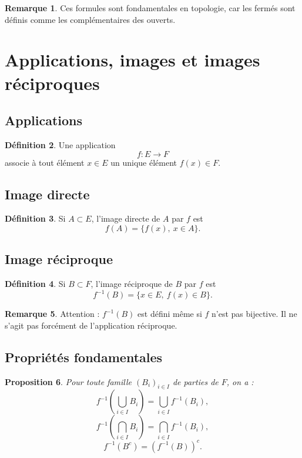 \documentclass[11pt,a4paper]{article}
\theoremstyle{definition}
\newtheorem{definition}{Définition}[section]
\newtheorem{remarque}[definition]{Remarque}
\theoremstyle{plain}
\newtheorem{proposition}[definition]{Proposition}
\begin{document}
\begin{remarque}
Ces formules sont fondamentales en topologie, car les fermés sont définis comme les complémentaires des ouverts.
\end{remarque}

\section{Applications, images et images réciproques}

\subsection{Applications}

\begin{definition}
Une application
\[
f:E\to F
\]
associe à tout élément $x\in E$ un unique élément $f(x)\in F$.
\end{definition}

\subsection{Image directe}

\begin{definition}
Si $A\subset E$, l'image directe de $A$ par $f$ est
\[
f(A)=\{f(x),\ x\in A\}.
\]
\end{definition}

\subsection{Image réciproque}

\begin{definition}
Si $B\subset F$, l'image réciproque de $B$ par $f$ est
\[
f^{-1}(B)=\{x\in E,\ f(x)\in B\}.
\]
\end{definition}

\begin{remarque}
Attention : $f^{-1}(B)$ est défini même si $f$ n'est pas bijective. Il ne s'agit pas forcément de l'application réciproque.
\end{remarque}

\subsection{Propriétés fondamentales}

\begin{proposition}
Pour toute famille $(B_i)_{i\in I}$ de parties de $F$, on a :
\[
f^{-1}\left(\bigcup_{i\in I}B_i\right)
=
\bigcup_{i\in I}f^{-1}(B_i),
\]
\[
f^{-1}\left(\bigcap_{i\in I}B_i\right)
=
\bigcap_{i\in I}f^{-1}(B_i),
\]
\[
f^{-1}(B^c)=\left(f^{-1}(B)\right)^c.
\]
\end{proposition}
\end{document}
